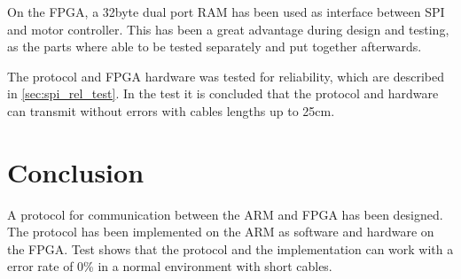 On the FPGA, a 32byte dual port RAM has been used as interface between SPI and motor controller. This has been a great advantage during design and testing, as the parts where able to be tested separately and put together afterwards.

The protocol and FPGA hardware was tested for reliability, which are described in \ref{sec:spi_rel_test}. In the test it is concluded that the protocol and hardware can transmit without errors with cables lengths up to 25cm.



\section{Conclusion}
A protocol for communication between the ARM and FPGA has been designed. The protocol has been implemented on the ARM as software and hardware on the FPGA. Test shows that the protocol and the implementation can work with a error rate of 0\% in a normal environment with short cables.


